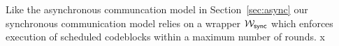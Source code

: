 Like the asynchronous communcation model in Section~\ref{sec:async} our synchronous communication model relies on a wrapper $\mathcal{W}_{{\mathsf {sync}}}$ which enforces execution of scheduled codeblocks within a maximum number of rounds.
x


%
%
%
%

